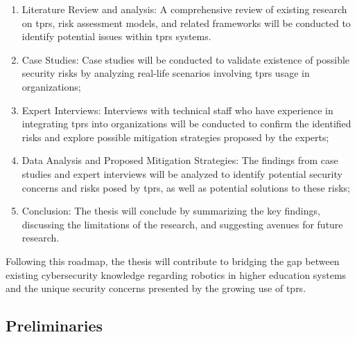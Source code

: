 \begin{enumerate}
  \item Literature Review and analysis: A comprehensive review of existing research on \ac{tprs}, risk assessment models, and related
  frameworks will be conducted to identify potential issues within \ac{tprs} systems.
  \item Case Studies: Case studies will be conducted to validate existence of possible security risks by analyzing real-life scenarios
  involving \ac{tprs} usage in organizations;
  \item Expert Interviews: Interviews with technical staff who have experience in integrating \ac{tprs} into organizations will be
  conducted to confirm the identified risks and explore possible mitigation strategies proposed by the experts;
  \item Data Analysis and Proposed Mitigation Strategies: The findings from case studies and expert interviews will be analyzed to
  identify potential security concerns and risks posed by \ac{tprs}, as well as potential solutions to these risks;
  \item Conclusion: The thesis will conclude by summarizing the key findings, discussing the limitations of the research, and suggesting avenues for future research.
\end{enumerate}
Following this roadmap, the thesis will contribute to bridging the gap between existing cybersecurity knowledge regarding robotics in
higher education systems and the unique security concerns presented by the growing use of \ac{tprs}.



\subsection{Preliminaries}



